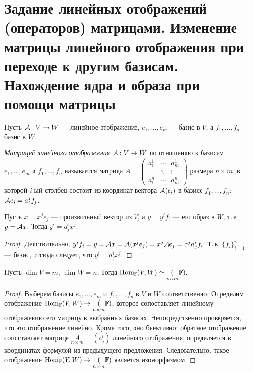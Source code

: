 \section{Задание линейных отображений (операторов) матрицами. Изменение матрицы линейного отображения при переходе к другим базисам. Нахождение ядра и образа при помощи матрицы}

Пусть $\mathcal{A}: V \to W$ --- линейное отображение, $e_1, \ldots, e_m$ --- базис в $V$, а $f_1, \ldots, f_n$ --- базис в $W$.

\begin{definition}
    \textit{Матрицей линейного отображения} $\mathcal{A}: V \to W$ по отношению к базисам $e_1, \ldots, e_m$ и $f_1, \ldots, f_n$ называется матрица
    $
    A = 
    \begin{pmatrix}
        a^1_1 & \cdots & a^1_m\\
        \vdots & \ddots & \vdots\\
        a^n_1 & \cdots & a^n_m
    \end{pmatrix}
    $
    размера $n \times m$, в которой $i$-ый столбец состоит из координат вектора $\mathcal{A}(e_i)$ в базисе $f_1, \ldots, f_n$: $\mathcal{A} e_i = a^j_if_j$.
\end{definition}

\begin{proposal}
    Пусть $x = x^je_j$ --- произвольный вектор из $V$, а $y = y^if_i$ --- его образ в $W$, т.\,е. $y = \mathcal{A} x$. Тогда $y^i = a^i_jx^j$.
\end{proposal}

\begin{proof}
    Действительно, $y^if_i = y = \mathcal{A} x = \mathcal{A}(x^je_j) = x^j\mathcal{A} e_j = x^ja^i_jf_i$. Т.\,к. $\{f_i\}_{i = 1}^n$ --- базис, отсюда следует, что $y^i = a^i_jx^j$.
\end{proof}

\begin{proposal}
    Пусть $\dim V = m$, $\dim W = n$. Тогда $\operatorname{Hom}_{\mathbb{F}}(V, W) \simeq \underset{n \times m}(\mathbb{F})$.
\end{proposal}

\begin{proof}
    Выберем базисы $e_1, \ldots, e_m$ и $f_1, \ldots, f_n$ в $V$ и $W$ соответственно. Определим отображение $\operatorname{Hom}_{\mathbb{F}}(V, W) \to \underset{n \times m}(\mathbb{F})$, которое сопоставляет линейному отображению его матрицу в выбранных базисах. Непосредственно проверяется, что это отображение линейно. Кроме того, оно биективно: обратное отображение сопоставляет матрице $\underset{n \times m}{A} = (a^i_j)$ линейного отображения, определяется в координатах формулой из предыдущего предложения. Следовательно, такое отображение $\operatorname{Hom}_{\mathbb{F}}(V, W) \to \underset{n \times m}(\mathbb{F})$ является изоморфизмом.
\end{proof}

